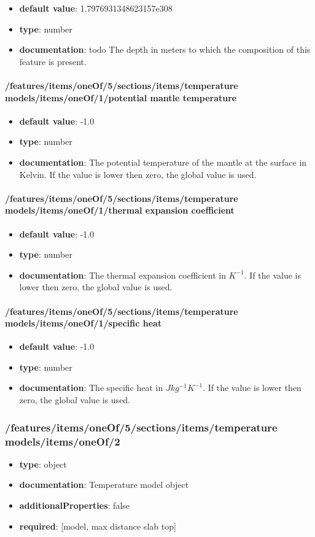 \begin{itemize}\item {\bf default value}: 1.7976931348623157e308
\item {\bf type}: number
\item {\bf documentation}: todo The depth in meters to which the composition of this feature is present.
\end{itemize}\paragraph{/features/items/oneOf/5/sections/items/temperature models/items/oneOf/1/potential mantle temperature}
\begin{itemize}\item {\bf default value}: -1.0
\item {\bf type}: number
\item {\bf documentation}: The potential temperature of the mantle at the surface in Kelvin. If the value is lower then zero, the global value is used.
\end{itemize}\paragraph{/features/items/oneOf/5/sections/items/temperature models/items/oneOf/1/thermal expansion coefficient}
\begin{itemize}\item {\bf default value}: -1.0
\item {\bf type}: number
\item {\bf documentation}: The thermal expansion coefficient in $K^{-1}$. If the value is lower then zero, the global value is used.
\end{itemize}\paragraph{/features/items/oneOf/5/sections/items/temperature models/items/oneOf/1/specific heat}
\begin{itemize}\item {\bf default value}: -1.0
\item {\bf type}: number
\item {\bf documentation}: The specific heat in $J kg^{-1} K^{-1}$. If the value is lower then zero, the global value is used.
\end{itemize}\subsubsection{/features/items/oneOf/5/sections/items/temperature models/items/oneOf/2}
\begin{itemize}\item {\bf type}: object
\item {\bf documentation}: Temperature model object
\item {\bf additionalProperties}: false
\item {\bf required}: [model, max distance slab top]\end{itemize}
